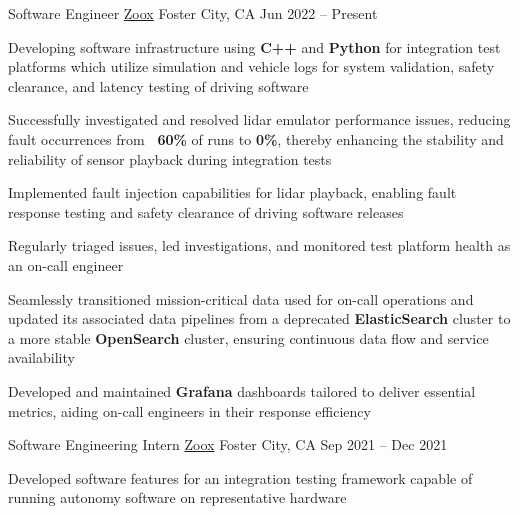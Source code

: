 \documentclass[]{awesome-cv}
\begin{document}
\begin{cventries}
	\cventry
	{Software Engineer}
	{\href{https://zoox.com/}{Zoox}}
	{Foster City, CA}
	{Jun 2022 – Present}
	{\begin{cvitems}
        \item Developing software infrastructure using \textbf{C++} and \textbf{Python} for integration test platforms which utilize simulation and vehicle logs for system validation, safety clearance, and latency testing of driving software
        \item Successfully investigated and resolved lidar emulator performance issues, reducing fault occurrences from \textbf{~60\%} of runs to \textbf{0\%}, thereby enhancing the stability and reliability of sensor playback during integration tests
        \item Implemented fault injection capabilities for lidar playback, enabling fault response testing and safety clearance of driving software releases
        \item Regularly triaged issues, led investigations, and monitored test platform health as an on-call engineer
        \item Seamlessly transitioned mission-critical data used for on-call operations and updated its associated data pipelines from a deprecated \textbf{ElasticSearch} cluster to a more stable \textbf{OpenSearch} cluster, ensuring continuous data flow and service availability
        \item Developed and maintained \textbf{Grafana} dashboards tailored to deliver essential metrics, aiding on-call engineers in their response efficiency
	\end{cvitems}}
	\cventry
	{Software Engineering Intern}
	{\href{https://zoox.com/}{Zoox}}
	{Foster City, CA}
	{Sep 2021 – Dec 2021}
	{\begin{cvitems}
	    \item Developed software features for an integration testing framework capable of running autonomy software on representative hardware

\end{cvitems}}
\end{cventries}
\end{document}

